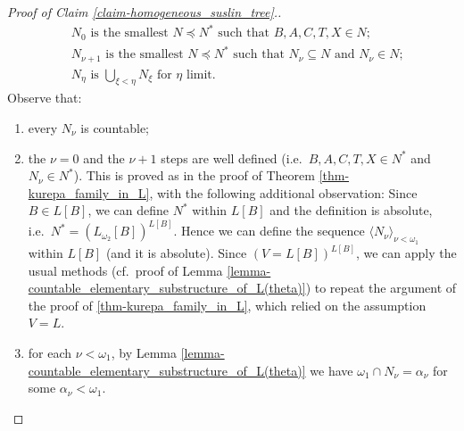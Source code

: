 \documentclass[11pt,a4paper]{report}
\theoremstyle{definition}
\theoremstyle{num.custom-title}
\theoremstyle{custom-title}
\DeclareMathOperator{\sse}{\subseteq}
\begin{document}
\begin{proof}[Proof of Claim \ref{claim-homogeneous_suslin_tree}.]
\begin{align}
\label{eq:sequence_of_submodels_homogeneous_suslin_tree}
& \text{$N_0$ is the smallest $N \preceq N^*$ such that $B,A,C,T,X \in N$;}\\
& \text{$N_{\nu+1}$ is the smallest $N \preceq N^*$ such that $N_\nu \sse N$ and $N_\nu \in N$;} \nonumber \\ 
& \text{$N_\eta$ is $\bigcup_{\xi < \eta} N_\xi$ for $\eta$ limit.} \nonumber
\end{align}
Observe that:
\begin{enumerate}[--]
\item every $N_\nu$ is countable;
\item the $\nu=0$ and the $\nu+1$ steps are well defined (i.e.\ $B,A,C,T,X \in N^*$ and $N_\nu \in N^*$). This is proved as in the proof of Theorem \ref{thm-kurepa_family_in_L}, with the following additional observation: Since $B \in L[B]$, we can define $N^*$ within $L[B]$ and the definition is absolute, i.e.\ $N^* = (L_{\omega_2}[B])^{L[B]}$. Hence we can define the sequence $\langle N_\nu \rangle_{\nu < \omega_1}$ within $L[B]$ (and it is absolute). Since $(V = L[B])^{L[B]}$, we can apply the usual methods (cf.\ proof of Lemma \ref{lemma-countable_elementary_substructure_of_L(theta)}) to repeat the argument of the proof of \ref{thm-kurepa_family_in_L}, which relied on the assumption $V=L$.
\item for each $\nu < \omega_1$, by Lemma \ref{lemma-countable_elementary_substructure_of_L(theta)} we have $\omega_1 \cap N_\nu = \alpha_\nu$ for some $\alpha_\nu < \omega_1$.
\end{enumerate}


\end{proof}
\end{document}
